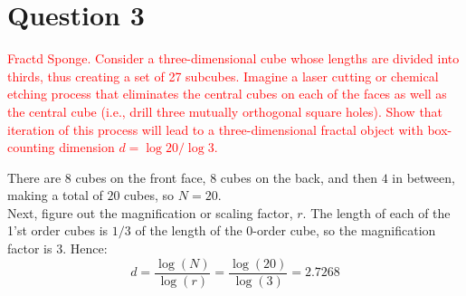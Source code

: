 \documentclass[12pt]{article}
\begin{document}


\newpage

\section{Question 3}
\textcolor{red}{Fractd Sponge. Consider a three-dimensional cube whose lengths are divided into thirds, thus creating a set of 27 subcubes. Imagine a laser cutting or chemical etching process that eliminates the central cubes on each of the faces as well as the central cube (i.e., drill three mutually orthogonal square holes). Show that iteration of this process will lead to a three-dimensional
fractal object with box-counting dimension $d = \log 20/\log 3$.}\\

\vspace{0.2 in}

There are 8 cubes on the front face, $8$ cubes on the back, and then $4$ in between, making a total of $20$ cubes, so $N = 20$.\\

Next, figure out the magnification or scaling factor, $r$. The length of each of the 1'st order cubes is $1/3$ of the length of the 0-order cube, so the magnification factor is $3$. Hence:
$$d=\frac{\log (N)}{\log (r)}=\frac{\log (20)}{\log (3)}=2.7268$$




\newpage
\end{document}
